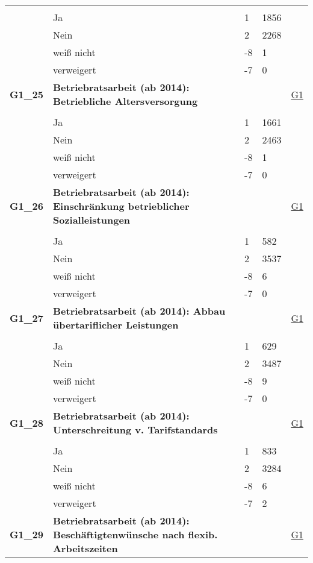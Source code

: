 \begin{longtable}{| L{2.5cm} | L{8.25cm}| C{1.5cm} | R{1.25cm} | C{2.25cm} |  }
   &  &  &  &  \\ 
   & Ja & 1 & 1856 &  \\ 
   & Nein & 2 & 2268 &  \\ 
   & weiß nicht & -8 & 1 &  \\ 
   & verweigert & -7 & 0 &  \\ 
   \midrule
\textbf{G1\_25}\label{var:suf:G1:25} & \textbf{Betriebratsarbeit (ab 2014): Betriebliche Altersversorgung} &  &  & \hyperref[G1]{G1} \\ 
   &  &  &  &  \\ 
   & Ja & 1 & 1661 &  \\ 
   & Nein & 2 & 2463 &  \\ 
   & weiß nicht & -8 & 1 &  \\ 
   & verweigert & -7 & 0 &  \\ 
   \midrule
\textbf{G1\_26}\label{var:suf:G1:26} & \textbf{Betriebratsarbeit (ab 2014): Einschränkung betrieblicher Sozialleistungen} &  &  & \hyperref[G1]{G1} \\ 
   &  &  &  &  \\ 
   & Ja & 1 & 582 &  \\ 
   & Nein & 2 & 3537 &  \\ 
   & weiß nicht & -8 & 6 &  \\ 
   & verweigert & -7 & 0 &  \\ 
   \midrule
\textbf{G1\_27}\label{var:suf:G1:27} & \textbf{Betriebratsarbeit (ab 2014): Abbau übertariflicher Leistungen} &  &  & \hyperref[G1]{G1} \\ 
   &  &  &  &  \\ 
   & Ja & 1 & 629 &  \\ 
   & Nein & 2 & 3487 &  \\ 
   & weiß nicht & -8 & 9 &  \\ 
   & verweigert & -7 & 0 &  \\ 
   \midrule
\textbf{G1\_28}\label{var:suf:G1:28} & \textbf{Betriebratsarbeit (ab 2014): Unterschreitung v. Tarifstandards} &  &  & \hyperref[G1]{G1} \\ 
   &  &  &  &  \\ 
   & Ja & 1 & 833 &  \\ 
   & Nein & 2 & 3284 &  \\ 
   & weiß nicht & -8 & 6 &  \\ 
   & verweigert & -7 & 2 &  \\ 
   \midrule
\textbf{G1\_29}\label{var:suf:G1:29} & \textbf{Betriebratsarbeit (ab 2014): Beschäftigtenwünsche nach flexib. Arbeitszeiten} &  &  & \hyperref[G1]{G1} \\ 

\end{longtable}
